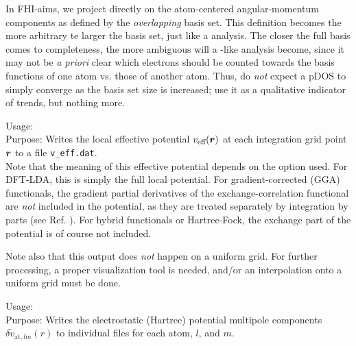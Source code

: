 In FHI-aims, we project directly on
the atom-centered angular-momentum components as defined by the
\emph{overlapping} basis set. This definition becomes the more arbitrary te
larger the basis set, just like a 
analysis. The closer the full basis comes to completeness, the
more ambiguous will a -like analysis become,
since it may not be \emph{a priori} clear which electrons should be counted
towards the basis functions of one atom vs. those of another atom. Thus, do
\emph{not} expect a pDOS to simply converge as the basis set size is
increased; use it as a qualitative indicator of trends, but nothing more. 


{
  \noindent
  Usage:   \\[1.0ex]
  Purpose: Writes the local effective potential $v_\text{eff}(\mbox{\boldmath$r$})$
    at each integration grid point $\mbox{\boldmath$r$}$ to a file
    \texttt{v\_eff.dat}. \\[1.0ex]
}
Note that the meaning of this effective potential depends on the
 option used. For DFT-LDA, this is simply the full local
potential. For gradient-corrected (GGA) functionals, the gradient
partial derivatives of the exchange-correlation functional are
\emph{not} included in the potential, as they are treated separately
by integration by parts (see Ref. \cite{Blum08}). For hybrid
functionals or Hartree-Fock, the exchange part of the potential is of
course not included. 

Note also that this output does \emph{not} happen on a uniform
grid. For further processing, a proper visualization tool is needed,
and/or an interpolation onto a uniform grid must be done.

{
  \noindent
  Usage:   \\[1.0ex]
  Purpose: Writes the electrostatic (Hartree) potential multipole 
    components $\delta\tilde{v}_{\text{at},lm}(r)$ to individual files
    for each atom, $l$, and $m$. \\[1.0ex]
}

